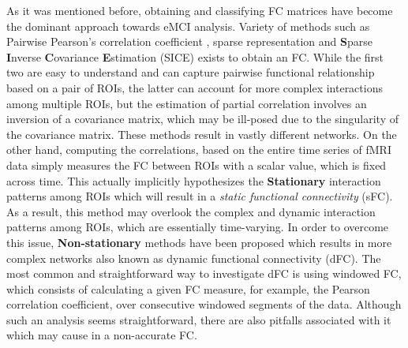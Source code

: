 \documentclass[preprint,12pt]{elsarticle}
\begin{document}
	As it was mentioned before, obtaining and classifying FC matrices have become the dominant approach towards eMCI analysis. 
	Variety of methods such as Pairwise Pearson’s correlation coefficient \cite{r10, r11}, sparse representation \cite{r10, r12, r13}  and \textbf{S}parse \textbf{I}nverse \textbf{C}ovariance \textbf{E}stimation (SICE)\cite{r15} exists to obtain an FC.
	While the first two are easy to understand and can capture pairwise functional relationship based on a pair of ROIs, the latter can account for more complex interactions among multiple ROIs, but the estimation of partial correlation involves an inversion of a covariance matrix, which may be ill-posed due to the singularity of the covariance matrix. 
	These methods result in vastly different networks\cite{r35}. On the other hand, computing the correlations, based on the entire time series of fMRI data simply measures the FC between ROIs with a scalar value, which is fixed across time. This actually implicitly hypothesizes the \textbf{Stationary} interaction patterns among ROIs which will result in a \textit{static functional connectivity} (sFC). As a result, this method may overlook the complex and dynamic interaction patterns among ROIs, which are essentially time-varying. In order to overcome this issue, \textbf{Non-stationary} methods have been proposed which results in more complex networks also known as dynamic functional connectivity (dFC)\cite{r16,r19,r56}. The most common and straightforward way to investigate dFC is using windowed FC, which consists of calculating a given FC measure, for example, the Pearson correlation coefficient, over consecutive windowed segments of the data\cite{r58,r59}. Although such an analysis seems straightforward, there are also pitfalls associated with it which may cause in a non-accurate FC\cite{r57}.
	
\end{document}

